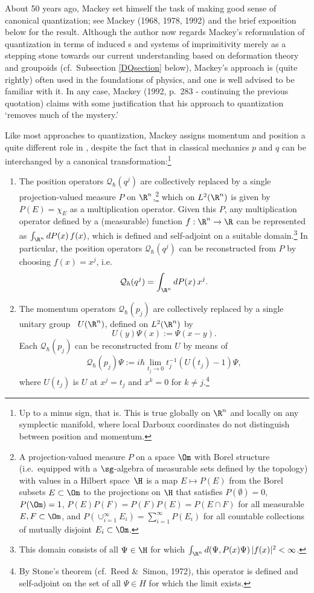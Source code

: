 \documentclass[12pt,titlepage]{article}
\newcommand{\beq}{\begin{equation}}
\newcommand{\eeq}{\end{equation}}
\newcommand{\Hs}{Hilbert space} \newcommand{\Bs}{Banach space}
\newcommand{\raw}{\rightarrow} \newcommand{\rat}{\mapsto}
\newcommand{\qh}{q_{\hbar}} \newcommand{\sgh}{\sigma_{\hbar}}
\newcommand{\inv}{^{-1}} \newcommand{\sa}{_{\R}}
\newcommand{\ch}{\chi} \newcommand{\ps}{\psi} \newcommand{\Ps}{\Psi}
\newcommand{\CQ}{{\mathcal Q}} \newcommand{\CR}{{\mathcal R}}
\renewcommand{\qh}{\CQ_{\hbar}}
\begin{document}
About 50 years ago, Mackey set himself the task of making good sense of canonical quantization; see Mackey (1968, 1978, 1992) and the brief exposition below for the result. Although the author now regards Mackey's  reformulation of quantization in terms of induced \rep s and systems of imprimitivity merely as a stepping stone towards our current understanding based on deformation theory and groupoids (cf.\ Subsection \ref{DQsection} below), Mackey's approach is (quite rightly) often used in the foundations of physics, and one is well advised to be familiar with it. In any case,  Mackey (1992, p.\ 283 - continuing the previous quotation) claims with some justification that his approach to quantization  `removes much of the mystery.'

Like most approaches to quantization, Mackey assigns momentum and position a quite different role in \qm, despite the fact that in classical mechanics $p$ and $q$ can be interchanged by a canonical transformation:\footnote{Up to a minus sign, that is. This is true globally on $\R^n$ and locally on any symplectic manifold, where local Darboux coordinates
do not distinguish between position and momentum.}
\begin{enumerate}
\item 
The position operators $\qh(q^j)$ are collectively replaced by a single projection-valued measure $P$ on $\R^n$,\footnote{\label{PVM} A projection-valued measure $P$ on a space $\Om$ with Borel structure (i.e.\ equipped with a $\sg$-algebra of measurable sets defined by the topology) with values in a \Hs\ $\H$ is a map $E\mapsto P(E)$ from the Borel subsets
$E\subset\Om$ to the projections on $\H$ that satisfies $P(\emptyset)=0$,
$P(\Om)=1$, $P(E) P(F)=P(F)P(E)=P(E\cap F)$ for all measurable $E,F\subset\Om$, and
$P(\cup_{i=1}^{\infty} E_i)=\sum_{i=1}^{\infty} P(E_i)$ for all countable collections of mutually disjoint $E_i\subset\Om$. 
} which on $L^2(\R^n)$ is given by $P(E)=\ch_E$ as a multiplication operator. Given this $P$, any multiplication operator defined by a (measurable) function $f:\R^n\raw\R$ can be represented as $\int_{\R^n} dP(x)\, f(x)$,
which is defined and self-adjoint on a suitable domain.\footnote{\label{domain} This domain consists of all
$\Psi\in\H$ for which $\int_{\R^n} d(\Psi,P(x)\Psi)\, |f(x)|^2<\infty$.} In particular, the position operators $\qh(q^j)$ can be reconstructed from $P$ by choosing $f(x)=x^j$, i.e.\ 
\beq \qh(q^j)=\int_{\R^n} dP(x)\, x^j.\eeq
\item The momentum operators $\qh(p_j)$ are collectively replaced by a single unitary group \rep\ $U(\R^n)$, defined  on $L^2(\R^n)$ by $$U(y)\Psi(x):=\Psi(x-y).$$ Each $\qh(p_j)$
can be reconstructed from $U$ by means of 
\beq \qh(p_j)\Psi:=i\hbar \lim_{t_j\raw 0} t_j\inv(U(t_j)-1)\Psi,\eeq
 where $U(t_j)$ is $U$ at $x^j=t_j$ and $x^k=0$ for $k\neq j$.\footnote{By Stone's theorem (cf.\ Reed \&\ Simon, 1972), this operator is defined and self-adjoint on the set of all $\Psi\in H$ for which the limit exists.} \end{enumerate}
\end{document}
